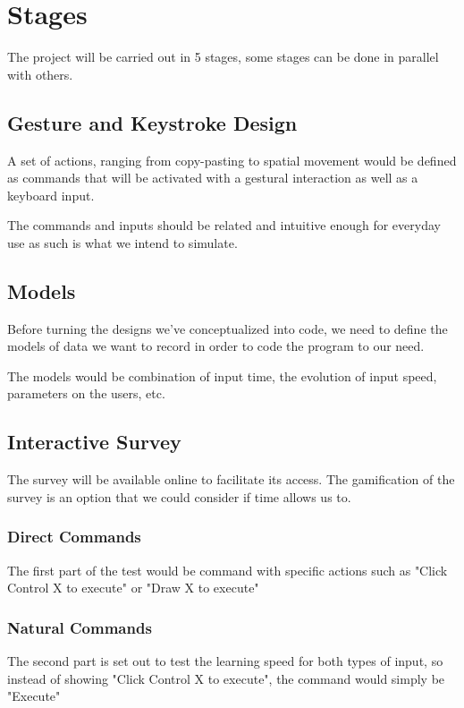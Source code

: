 \documentclass[12pt]{article}
\begin{document}
\section{Stages}

The project will be carried out in 5 stages, some stages can be done in parallel with others.

\subsection{Gesture and Keystroke Design}
A set of actions, ranging from copy-pasting to spatial movement would be defined as commands that will be activated with a gestural interaction as well as a keyboard input. 

The commands and inputs should be related and intuitive enough for everyday use as such is what we intend to simulate.

\subsection{Models}
Before turning the designs we've conceptualized into code, we need to define the models of data we want to record in order to code the program to our need.

The models would be combination of input time, the evolution of input speed, parameters on the users, etc.

\subsection{Interactive Survey}
The survey will be available online to facilitate its access.
The gamification of the survey is an option that we could consider if time allows us to.

\subsubsection{Direct Commands}
The first part of the test would be command with specific actions such as "Click Control X to execute" or "Draw X to execute"

\subsubsection{Natural Commands}
The second part is set out to test the learning speed for both types of input, so instead of showing "Click Control X to execute", the command would simply be "Execute"
\end{document}
